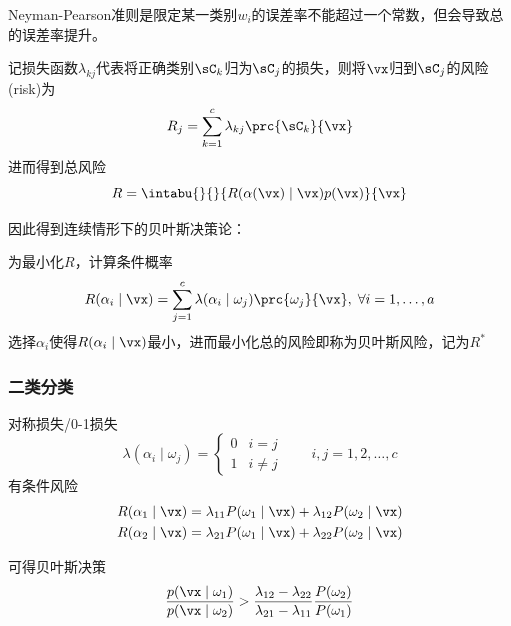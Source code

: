 Neyman-Pearson准则是限定某一类别$w_i$的误差率不能超过一个常数，但会导致总的误差率提升。


记损失函数$\lambda_{kj}$代表将正确类别$\sC_k$归为$\sC_j$的损失，则将$\vx$归到$\sC_j$的风险(risk)为
\[R_j=\sum_{k=1}^c\lambda_{kj}\prc{\sC_k}{\vx}\]
进而得到总风险
\[R=\intabu{}{}{R(\alpha(\vx)\mid\vx)p(\vx)}{\vx}\]

因此得到连续情形下的贝叶斯决策论：
\begin{theorem}
为最小化$R$，计算条件概率
\[R(\alpha_i\mid\vx)=\sum_{j=1}^c\lambda(\alpha_i\mid\omega_j)\prc{\omega_j}{\vx},\;\forall i=1,\ldots,a\]
选择$\alpha_i$使得$R(\alpha_i\mid\vx)$最小，进而最小化总的风险即称为贝叶斯风险，记为$R^*$
\end{theorem}

\subsubsection{二类分类}
对称损失/0-1损失
\[\lambda(\alpha_i\mid\omega_j)=
\begin{cases}
0 & i=j\\
1 & i\ne j
\end{cases}
\qquad i,j=1,2,\ldots,c\]
有条件风险
\[\begin{aligned}
R(\alpha_1\mid\vx)&=\lambda_{11}P(\omega_1\mid\vx)+\lambda_{12}P(\omega_2\mid\vx)\\
R(\alpha_2\mid\vx)&=\lambda_{21}P(\omega_1\mid\vx)+\lambda_{22}P(\omega_2\mid\vx)
\end{aligned}\]

可得贝叶斯决策
\[\frac{p(\vx\mid\omega_1)}{p(\vx\mid\omega_2)}>\frac{\lambda_{12}-\lambda_{22}}{\lambda_{21}-\lambda_{11}}\frac{P(\omega_2)}{P(\omega_1)}\]

